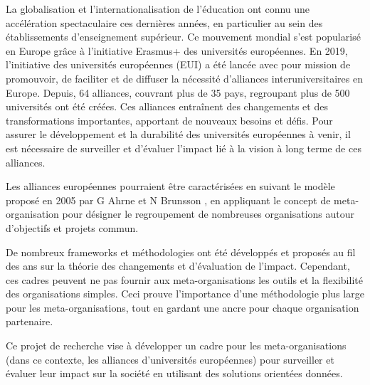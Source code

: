 La globalisation et l'internationalisation de l'éducation ont connu une accélération spectaculaire ces dernières années, en particulier au sein des établissements d'enseignement supérieur. Ce mouvement mondial s'est popularisé en Europe grâce à l'initiative Erasmus+ des universités européennes. En 2019, l'initiative des universités européennes (EUI) a été lancée avec pour mission de promouvoir, de faciliter et de diffuser la nécessité d'alliances interuniversitaires en Europe. Depuis, 64 alliances, couvrant plus de 35 pays, regroupant plus de 500 universités ont été créées. Ces alliances entraînent des changements et des transformations importantes, apportant de nouveaux besoins et défis. Pour assurer le développement et la durabilité des universités européennes à venir, il est nécessaire de surveiller et d'évaluer l'impact lié à la vision à long terme de ces alliances.

Les alliances européennes pourraient être caractérisées en suivant le modèle proposé en 2005 par G Ahrne et N Brunsson \cite{ahrne_organizations_2005}, en appliquant le concept de meta-organisation pour désigner le regroupement de nombreuses organisations autour d'objectifs et projets commun. 

De nombreux frameworks et méthodologies ont été développés et proposés au fil des ans sur la théorie des changements et  d'évaluation de l'impact. Cependant, ces cadres peuvent ne pas fournir aux meta-organisations les outils et la flexibilité des organisations simples. Ceci prouve l'importance d'une méthodologie plus large pour les meta-organisations, tout en gardant une ancre pour chaque organisation partenaire.

Ce projet de recherche vise à développer un cadre pour les meta-organisations (dans ce contexte, les alliances d'universités européennes) pour surveiller et évaluer leur impact sur la société en utilisant des solutions orientées données.